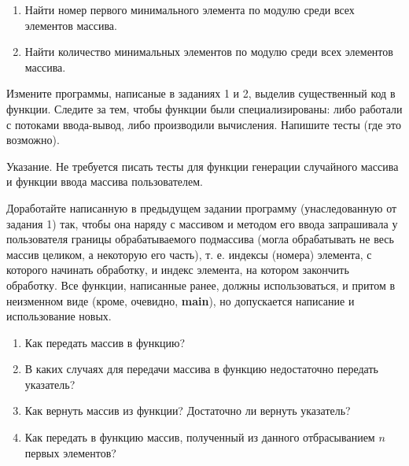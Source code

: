 \begin{enumerate}

	\item Найти номер первого минимального элемента по модулю среди всех элементов массива.

	\item Найти количество минимальных элементов по модулю среди всех элементов массива.

\end{enumerate}


\labtask

Измените программы, написаные в заданиях 1 и 2, выделив существенный код в функции.
Следите за тем, чтобы функции были специализированы: либо работали с потоками ввода-вывод, либо производили вычисления.
Напишите тесты (где это возможно).

Указание. Не требуется писать тесты для функции генерации случайного массива и функции ввода массива пользователем. 

\labtask

Доработайте написанную в предыдущем задании программу (унаследованную от задания 1) так, чтобы она наряду с массивом и методом его ввода запрашивала у пользователя границы обрабатываемого подмассива (могла обрабатывать не весь массив целиком, а некоторую его часть), т. е. индексы (номера) элемента, с которого начинать обработку, и индекс элемента, на котором закончить обработку.
Все функции, написанные ранее, должны использоваться, и притом в неизменном виде (кроме, очевидно, \textbf{main}), но допускается написание и использование новых.

\labworkquestions

\begin{enumerate}

	\item
		Как передать массив в функцию?
	\item
		В каких случаях для передачи массива в функцию недостаточно передать указатель?
	\item
		Как вернуть массив из функции? Достаточно ли вернуть указатель?
	\item
		Как передать в функцию массив, полученный из данного отбрасыванием $n$ первых элементов?
\end{enumerate}



